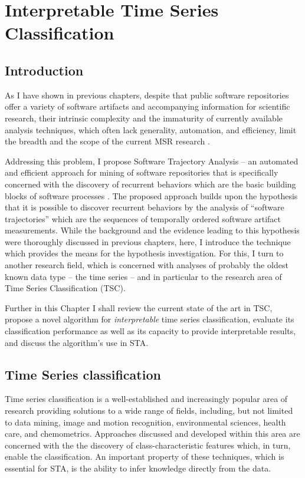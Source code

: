 \chapter{Interpretable Time Series Classification}\label{chapter_sax_vsm}

\section{Introduction}
As I have shown in previous chapters, despite that public software repositories offer a variety of software artifacts 
and accompanying information for scientific research, their intrinsic complexity and the immaturity of 
currently available analysis techniques, which often lack generality, automation, and efficiency, limit the breadth 
and the scope of the current MSR research \cite{citeulike:7853299} \cite{citeulike:12550438}.

Addressing this problem, I propose Software Trajectory Analysis -- an automated and efficient approach for mining 
of software repositories that is specifically concerned with the discovery of recurrent behaviors which are the basic building 
blocks of software processes \cite{neal2012habits} \cite{1903} \cite{citeulike:13208461}. 
The proposed approach builds upon the hypothesis that it is possible to discover recurrent behaviors by the analysis 
of ``software trajectories'' which are the sequences of temporally ordered software artifact measurements.
While the background and the evidence leading to this hypothesis were thoroughly discussed in previous chapters, 
here, I introduce the technique which provides the means for the hypothesis investigation. 
For this, I turn to another research field, which is concerned with analyses of probably the oldest known 
data type -- the time series \cite{citeulike:1454223} -- and in particular to the research area of 
Time Series Classification (TSC).

Further in this Chapter I shall review the current state of the art in TSC, 
propose a novel algorithm for \textit{interpretable} time series classification, 
evaluate its classification performance as well as its capacity to provide interpretable results, 
and discuss the algorithm's use in STA.

\section{Time Series classification}
Time series classification is a well-established and increasingly popular area of research providing solutions to a wide 
range of fields, including, but not limited to data mining, image and motion recognition, environmental sciences, health care, 
and chemometrics. Approaches discussed and developed within this area are concerned with the the discovery of class-characteristic 
features which, in turn, enable the classification. An important property of these techniques, 
which is essential for STA, is the ability to infer knowledge directly from the data.

